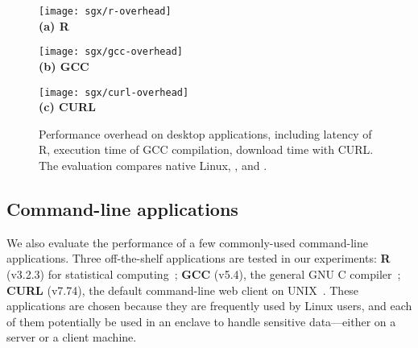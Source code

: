 \begin{figure*}[t!]
\centering

\begin{minipage}{.65\textwidth}
\centering
\footnotesize
\vspace{6pt}
\texttt{[image: sgx/r-overhead]}\\
\vspace{3pt}
{\bf (a) R}
\vspace{6pt}
\end{minipage}
\begin{minipage}{.42\textwidth}
\centering
\footnotesize
\vspace{6pt}
\texttt{[image: sgx/gcc-overhead]}\\
\vspace{3pt}
{\bf (b) GCC}
\vspace{6pt}
\end{minipage}
\begin{minipage}{.38\textwidth}
\centering
\footnotesize
\vspace{6pt}
\texttt{[image: sgx/curl-overhead]}\\
\vspace{3pt}
{\bf (c) CURL}
\vspace{6pt}
\end{minipage}

\caption{Performance overhead on desktop applications, including latency of R, execution time of GCC compilation, download time with CURL. The evaluation compares native Linux, \graphene{}, and \graphenesgx{}.} %
\label{fig:desktop-overhead}
\end{figure*}



\subsection{Command-line applications}


We also evaluate the performance of a few commonly-used command-line applications.
Three off-the-shelf applications are tested in our experiments:
{\bf R} (v3.2.3) for statistical computing~\cite{r-project}; {\bf GCC} (v5.4), the general GNU C compiler~\cite{gcc}; {\bf CURL} (v7.74), the default command-line web client on UNIX~\cite{curl}.
These applications are chosen because they are frequently used by Linux users,
and each of them potentially  be used 
in an enclave to handle sensitive data---either on a server or a client
machine.



